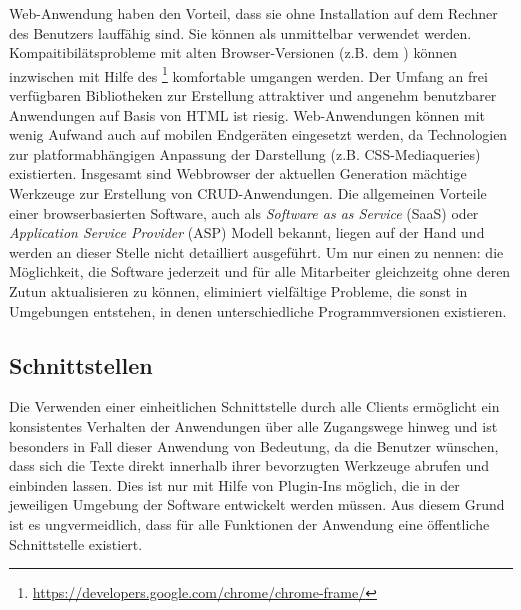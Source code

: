 Web-Anwendung haben den Vorteil, dass sie ohne Installation auf dem Rechner des Benutzers lauffähig sind. Sie können als unmittelbar verwendet werden. Kompaitibilätsprobleme mit alten Browser-Versionen (z.B. dem ) können inzwischen mit Hilfe des \footnote{\url{https://developers.google.com/chrome/chrome-frame/}} komfortable umgangen werden. Der Umfang an frei verfügbaren Bibliotheken zur Erstellung attraktiver und angenehm benutzbarer Anwendungen auf Basis von HTML ist riesig. Web-Anwendungen können mit wenig Aufwand auch auf mobilen Endgeräten eingesetzt werden, da Technologien zur platformabhängigen Anpassung der Darstellung (z.B. CSS-Mediaqueries) existierten. Insgesamt sind Webbrowser der aktuellen Generation mächtige Werkzeuge zur Erstellung von CRUD-Anwendungen. \cite{ms-key-software-development-trends} Die allgemeinen Vorteile einer browserbasierten Software, auch als \emph{Software as as Service} (SaaS) oder \emph{Application Service Provider} (ASP) Modell bekannt, liegen auf der Hand und werden an dieser Stelle nicht detailliert ausgeführt. Um nur einen zu nennen: die Möglichkeit, die Software jederzeit und für alle Mitarbeiter gleichzeitg ohne deren Zutun aktualisieren zu können, eliminiert vielfältige Probleme, die sonst in Umgebungen entstehen, in denen unterschiedliche Programmversionen existieren.

\subsection{Schnittstellen} 

Die Verwenden einer einheitlichen Schnittstelle durch alle Clients ermöglicht ein konsistentes Verhalten der Anwendungen über alle Zugangswege hinweg und ist besonders in Fall dieser Anwendung von Bedeutung, da die Benutzer wünschen, dass sich die Texte direkt innerhalb ihrer bevorzugten Werkzeuge abrufen und einbinden lassen. Dies ist nur mit Hilfe von Plugin-Ins möglich, die in der jeweiligen Umgebung der Software entwickelt werden müssen. Aus diesem Grund ist es ungvermeidlich, dass für alle Funktionen der Anwendung eine öffentliche Schnittstelle existiert.

